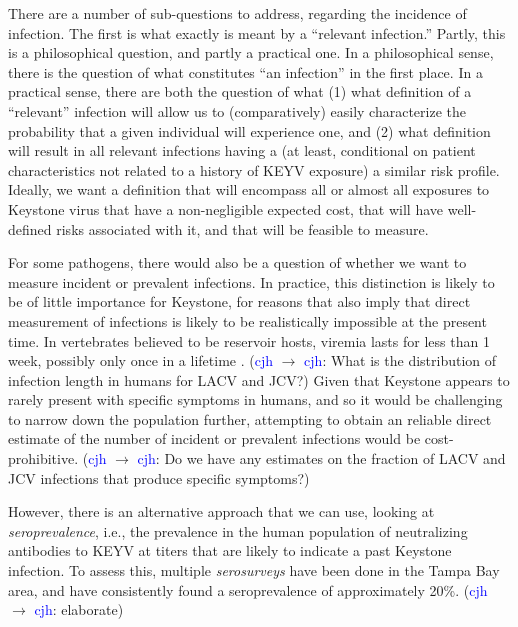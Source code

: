\documentclass[12pt]{article}
\newcommand{\cjh}{\textcolor{blue}{cjh}}
\newcommand{\msg}[3]{(#1 $\rightarrow$ #2: #3)}
\newcommand{\mcc}[1]{\msg\cjh\cjh{#1}}
\begin{document}
        There are a number of sub-questions to address, regarding the incidence of infection. The first is what exactly is meant by a ``relevant infection.'' Partly, this is a philosophical question, and partly a practical one. In a philosophical sense, there is the question of what constitutes ``an infection'' in the first place. In a practical sense, there are both the question of what (1) what definition of a ``relevant'' infection will allow us to (comparatively) easily characterize the probability that a given individual will experience one, and (2) what definition will result in all relevant infections having a (at least, conditional on patient characteristics not related to a history of KEYV exposure) a similar risk profile. Ideally, we want a definition that will encompass all or almost all exposures to Keystone virus that have a non-negligible expected cost, that will have well-defined risks associated with it, and that will be feasible to measure.

        For some pathogens, there would also be a question of whether we want to measure incident or prevalent infections. In practice, this distinction is likely to be of little importance for Keystone, for reasons that also imply that direct measurement of infections is likely to be realistically impossible at the present time. In vertebrates believed to be reservoir hosts, viremia lasts for less than 1 week, possibly only once in a lifetime \cite{asdf}. \mcc{What is the distribution of infection length in humans for LACV and JCV?} Given that Keystone appears to rarely present with specific symptoms in humans, and so it would be challenging to narrow down the population further, attempting to obtain an reliable direct estimate of the number of incident or prevalent infections would be cost-prohibitive. \mcc{Do we have any estimates on the fraction of LACV and JCV infections that produce specific symptoms?}
        

        However, there is an alternative approach that we can use, looking at \textit{seroprevalence}, i.e., the prevalence in the human population of neutralizing antibodies to KEYV at titers that are likely to indicate a past Keystone infection. To assess this, multiple \textit{serosurveys} have been done in the Tampa Bay area\cite{asdf}, and have consistently found a seroprevalence of approximately 20\%\cite{asdf}. \mcc{elaborate}
\end{document}
